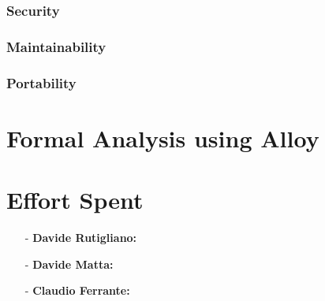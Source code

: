 \documentclass[a4paper]{article}
\begin{document}
        \subsubsection{Security}
        
        \subsubsection{Maintainability}
        
        \subsubsection{Portability}
        
\newpage
\section{Formal Analysis using Alloy}

\newpage
\section{Effort Spent}
    \begin{itemize}
        \item[-] \textbf{Davide Rutigliano:}
        
        \item[-] \textbf{Davide Matta:}
        
        \item[-] \textbf{Claudio Ferrante:}
    \end{itemize}
\end{document}
